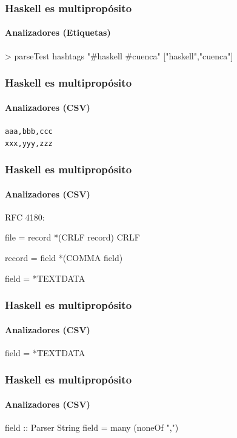 \documentclass[spanish]{beamer}
\begin{document}

\begin{frame}[fragile]
  \frametitle{Haskell es multipropósito}
  \framesubtitle{Analizadores (Etiquetas)}

  \begin{code}
> parseTest hashtags "#haskell #cuenca"
["haskell","cuenca"]
  \end{code}
\end{frame}


\begin{frame}
  \frametitle{Haskell es multipropósito}
  \framesubtitle{Analizadores (CSV)}

  \texttt{aaa,bbb,ccc}\\
  \texttt{xxx,yyy,zzz}
\end{frame}


\begin{frame}[fragile]
  \frametitle{Haskell es multipropósito}
  \framesubtitle{Analizadores (CSV)}

  RFC 4180:
  \begin{code}
file = record *(CRLF record) CRLF

record = field *(COMMA field)

field = *TEXTDATA
  \end{code}
\end{frame}


\begin{frame}[fragile]
  \frametitle{Haskell es multipropósito}
  \framesubtitle{Analizadores (CSV)}

  \begin{code}
field = *TEXTDATA
  \end{code}
\end{frame}


\begin{frame}[fragile]
  \frametitle{Haskell es multipropósito}
  \framesubtitle{Analizadores (CSV)}

  \begin{code}
field :: Parser String
field = many (noneOf ",\n")
  \end{code}
\end{frame}
\end{document}
